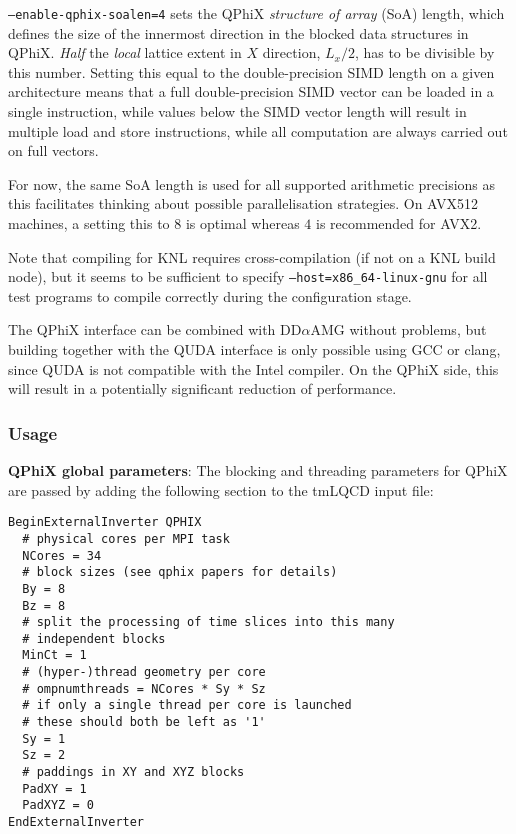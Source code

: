 \texttt{--enable-qphix-soalen=4} sets the QPhiX \emph{structure of array} (SoA) length, which defines the size of the innermost direction in the blocked data structures in QPhiX.
\emph{Half} the \emph{local} lattice extent in $X$ direction, $L_x/2$, has to be divisible by this number.
Setting this equal to the double-precision SIMD length on a given architecture means that a full double-precision SIMD vector can be loaded in a single instruction, while values below the SIMD vector length will result in multiple load and store instructions, while all computation are always carried out on full vectors.

For now, the same SoA length is used for all supported arithmetic precisions as this facilitates thinking about possible parallelisation strategies.
On AVX512 machines, a setting this to $8$ is optimal whereas $4$ is recommended for AVX2.

Note that compiling for KNL requires cross-compilation (if not on a KNL build node), but it seems to be sufficient to specify \texttt{--host=x86\_64-linux-gnu} for all test programs to compile correctly during the configuration stage. 

The QPhiX interface can be combined with DD$\alpha$AMG without problems, but building together with the QUDA interface is only possible using GCC or clang, since QUDA is not compatible with the Intel compiler.
On the QPhiX side, this will result in a potentially significant reduction of performance.

\subsubsection{Usage}

\noindent\textbf{QPhiX global parameters}: The blocking and threading parameters for QPhiX are passed by adding the following section to the tmLQCD input file:
\begin{framed}
\begin{Verbatim}
BeginExternalInverter QPHIX
  # physical cores per MPI task
  NCores = 34
  # block sizes (see qphix papers for details)
  By = 8
  Bz = 8
  # split the processing of time slices into this many
  # independent blocks
  MinCt = 1
  # (hyper-)thread geometry per core
  # ompnumthreads = NCores * Sy * Sz
  # if only a single thread per core is launched
  # these should both be left as '1'
  Sy = 1
  Sz = 2
  # paddings in XY and XYZ blocks
  PadXY = 1
  PadXYZ = 0
EndExternalInverter    
\end{Verbatim}
\end{framed}

